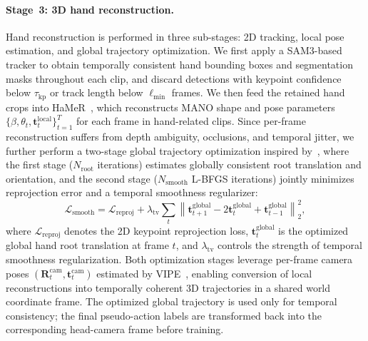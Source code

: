 \documentclass{llmxive}
\begin{document}
\paragraph{Stage~3: 3D hand reconstruction.}
Hand reconstruction is performed in three sub-stages: 2D tracking, local pose estimation, and global trajectory optimization. We first apply a SAM3-based~\cite{sam3} tracker to obtain temporally consistent hand bounding boxes and segmentation masks throughout each clip, and discard detections with keypoint confidence below $\tau_{\mathrm{kp}}$ or track length below $\ell_{\min}$ frames. We then feed the retained hand crops into HaMeR~\cite{pavlakos2024reconstructing}, which reconstructs MANO shape and pose parameters $\{\beta, \theta_t, \mathbf{t}^{\mathrm{local}}_t\}_{t=1}^{T}$ for each frame in hand-related clips. Since per-frame reconstruction suffers from depth ambiguity, occlusions, and temporal jitter, we further perform a two-stage global trajectory optimization inspired by~\cite{dyn}, where the first stage ($N_{\mathrm{root}}$ iterations) estimates globally consistent root translation and orientation, and the second stage ($N_{\mathrm{smooth}}$ L-BFGS iterations) jointly minimizes reprojection error and a temporal smoothness regularizer:
\begin{equation}
\mathcal{L}_{\mathrm{smooth}}
=
\mathcal{L}_{\mathrm{reproj}}
+
\lambda_{\mathrm{tv}}
\sum_t
\left\|
\mathbf{t}^{\mathrm{global}}_{t+1}
-
2\mathbf{t}^{\mathrm{global}}_{t}
+
\mathbf{t}^{\mathrm{global}}_{t-1}
\right\|_2^2 ,
\end{equation}
where $\mathcal{L}_{\mathrm{reproj}}$ denotes the 2D keypoint reprojection loss, $\mathbf{t}^{\mathrm{global}}_t$ is the optimized global hand root translation at frame $t$, and $\lambda_{\mathrm{tv}}$ controls the strength of temporal smoothness regularization. Both optimization stages leverage per-frame camera poses $(\mathbf{R}_t^{\mathrm{cam}}, \mathbf{t}_t^{\mathrm{cam}})$ estimated by VIPE~\cite{vipe}, enabling conversion of local reconstructions into temporally coherent 3D trajectories in a shared world coordinate frame. The optimized global trajectory is used only for temporal consistency; the final pseudo-action labels are transformed back into the corresponding head-camera frame before training.
\end{document}
